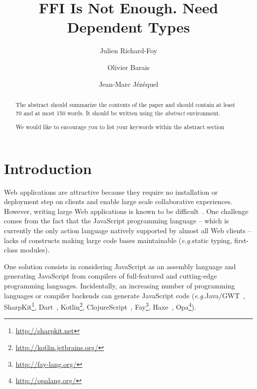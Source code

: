 \documentclass[runningheads,a4paper]{llncs}
\newcommand{\keywords}[1]{\par\addvspace\baselineskip
\noindent\keywordname\enspace\ignorespaces#1}
\newcommand{\eg}{\emph{e.g.}}
\begin{document}
\mainmatter

\title{FFI Is Not Enough. Need Dependent Types}

\author{Julien Richard-Foy \and Olivier Barais\and Jean-Marc Jézéquel}


\maketitle


\begin{abstract}
The abstract should summarize the contents of the paper and should
contain at least 70 and at most 150 words. It should be written using the
\emph{abstract} environment.
\keywords{We would like to encourage you to list your keywords within
the abstract section}
\end{abstract}


\section{Introduction}

Web applications are attractive because they require no installation or deployment step on clients and enable large
scale collaborative experiences. However, writing large Web applications is known to be
difficult~\cite{Mikkonen08_SpaghettiJs,Preciado05_RIAMethodologyNecessity}. One challenge comes from the fact that
the JavaScript programming language -- which is currently the only action language natively supported by almost all
Web clients -- lacks of constructs making large code bases maintainable (\eg static typing, first-class modules).

One solution consists in considering JavaScript as an assembly language and generating JavaScript from compilers
of full-featured and cutting-edge programming languages. Incidentally, an increasing number of programming languages
or compiler backends can generate JavaScript code (\eg Java/GWT~\cite{Chaganti07_GWT},
SharpKit\footnote{\href{http://sharpkit.net}{http://sharpkit.net}}, Dart~\cite{Griffith11_Dart},
Kotlin\footnote{\href{http://kotlin.jetbrains.org/}{http://kotlin.jetbrains.org/}},
ClojureScript~\cite{McGranaghan11_ClojureScript}, Fay\footnote{\href{http://fay-lang.org/}{http://fay-lang.org/}},
Haxe~\cite{Cannasse08_HaXe}, Opa\footnote{\href{http://opalang.org/}{http://opalang.org/}}).
\end{document}
